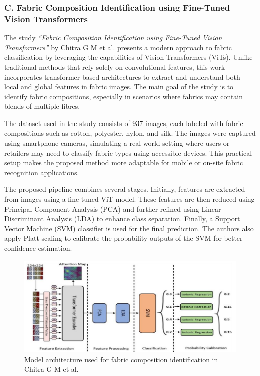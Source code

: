 \subsubsection[C. Fabric Composition Identification using Fine-Tuned Vision Transformers]{C. Fabric Composition Identification using Fine-Tuned Vision Transformers~\cite{chitra2023fabric}}

The study \textit{“Fabric Composition Identification using Fine-Tuned Vision Transformers”} by Chitra G M et al. presents a modern approach to fabric classification by leveraging the capabilities of Vision Transformers (ViTs). Unlike traditional methods that rely solely on convolutional features, this work incorporates transformer-based architectures to extract and understand both local and global features in fabric images. The main goal of the study is to identify fabric compositions, especially in scenarios where fabrics may contain blends of multiple fibres.

The dataset used in the study consists of 937 images, each labeled with fabric compositions such as cotton, polyester, nylon, and silk. The images were captured using smartphone cameras, simulating a real-world setting where users or retailers may need to classify fabric types using accessible devices. This practical setup makes the proposed method more adaptable for mobile or on-site fabric recognition applications.

The proposed pipeline combines several stages. Initially, features are extracted from images using a fine-tuned ViT model. These features are then reduced using Principal Component Analysis (PCA) and further refined using Linear Discriminant Analysis (LDA) to enhance class separation. Finally, a Support Vector Machine (SVM) classifier is used for the final prediction. The authors also apply Platt scaling to calibrate the probability outputs of the SVM for better confidence estimation.

\begin{figure}[H]
    \centering
    \begin{minipage}{1\linewidth}
        \includegraphics[width=\linewidth]{images/Paper3Model.png}
    \end{minipage}
    \caption[Model architecture - Chitra G M et al.~\cite{chitra2023fabric}]{Model architecture used for fabric composition identification in Chitra G M et al.~\cite{chitra2023fabric}}
\end{figure}

